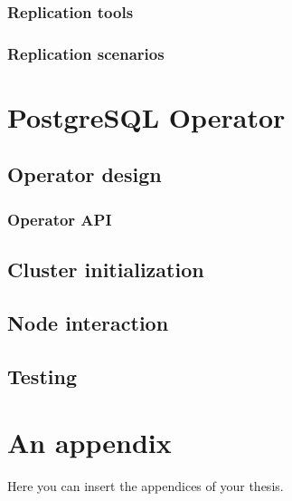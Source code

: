 \documentclass[
  digital, %
  twoside, %
  table,   %
  lof,     %
  lot,     %
]{fithesis3}
\begin{document}
\subsection{Replication tools}
\subsection{Replication scenarios}

\chapter{PostgreSQL Operator}
\section{Operator design}
\subsection{Operator API}
\section{Cluster initialization}
\section{Node interaction}
\section{Testing}

\appendix %
\chapter{An appendix}
Here you can insert the appendices of your thesis.
\end{document}
